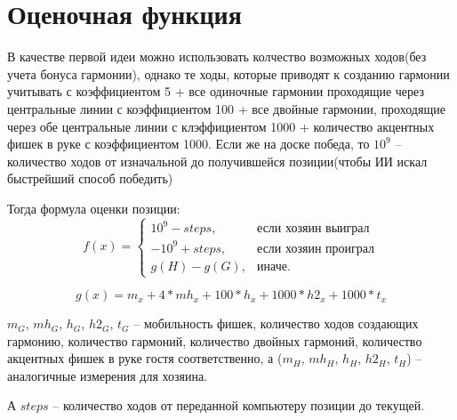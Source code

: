 \documentclass[a4paper,12pt]{diplom}
\begin{document}
\section{Оценочная функция}

В качестве первой идеи можно использовать колчество возможных ходов(без учета бонуса гармонии), однако те ходы, которые приводят к созданию гармонии учитывать с коэффициентом 5 + все одиночные гармонии проходящие через центральные линии с коэффициентом 100 + все двойные гармонии, проходящие через обе центральные линии с клэффициентом 1000 + количество акцентных фишек в руке с коэффициентом 1000. Если же на доске победа, то $10^9$ – количество ходов от изначальной до получившейся позиции(чтобы ИИ искал быстрейший способ победить)

Тогда формула оценки позиции:
\begin{equation}
	f(x) = \begin{cases}
		10^9 - steps, & \text{если хозяин выиграл}\\
		-10^9 + steps, & \text{если хозяин проиграл}\\
		g(H) - g(G), & \text{иначе.}
	\end{cases}
\end{equation}

\begin{equation}
	g(x) =  m_{x} + 4 * mh_{x} + 100 * h_{x} + 1000*h2_{x} + 1000*t_{x}
\end{equation}

$m_{G}$, $mh_{G}$, $h_{G}$, $h2_{G}$, $t_{G}$ – мобильность фишек, количество ходов создающих гармонию, количество гармоний, количество двойных гармоний, количество акцентных фишек в руке гостя соответственно, а ($m_{H}$, $mh_{H}$, $h_{H}$, $h2_{H}$, $t_{H}$) – аналогичные измерения для хозяина.

А $steps$ – количество ходов от переданной компьютеру позиции до текущей.
\end{document}
